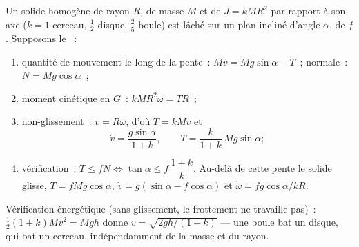 \begin{method}\label{met:b2:rigid-body-mechanics:incline}
Un solide homogène de rayon $R$, de masse $M$ et de  $J =
kMR^2$ par rapport à son axe ($k = 1$ cerceau, $\tfrac12$ disque, $\tfrac25$ boule)
est lâché sur un plan incliné d'angle $\alpha$, de 
$f$. Supposons le ~:
\begin{enumerate}
  \item quantité de mouvement le long de la pente~: $M\dot v = Mg\sin\alpha - T$~; normale~:
        $N = Mg\cos\alpha$~;
  \item moment cinétique en $G$~: $kMR^2\dot\omega = TR$~;
  \item non-glissement~: $v = R\omega$, d'où $T = kM\dot v$ et
        \[
        \dot v = \frac{g\sin\alpha}{1 + k} , \qquad T = \frac{k}{1 + k}\,
        Mg\sin\alpha ;
        \]
  \item vérification~: $T \le fN \iff \tan\alpha \le f\,\dfrac{1 + k}{k}$.
        Au-delà de cette pente le solide glisse, $T = fMg\cos\alpha$, $\dot v =
        g(\sin\alpha - f\cos\alpha)$ et $\dot\omega = fg\cos\alpha/kR$.
\end{enumerate}
Vérification énergétique (sans glissement, le frottement ne travaille pas)~: $\tfrac12(1 + k)Mv^2 =
Mgh$ donne $v = \sqrt{2gh/(1 + k)}$ --- une boule bat un disque, qui
bat un cerceau, indépendamment de la masse et du rayon.
\end{method}

